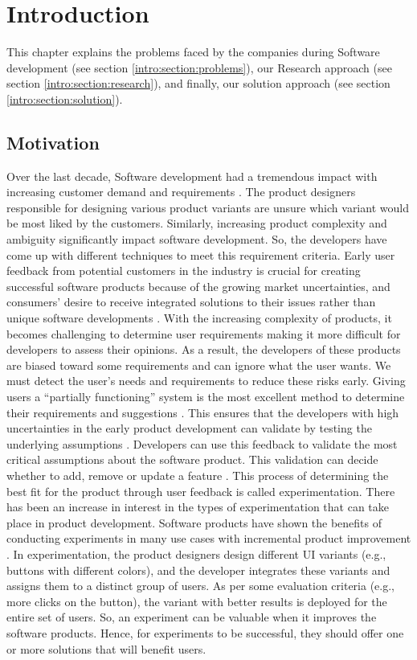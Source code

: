 \chapter{Introduction} \label{chap:intro}
This chapter explains the problems faced by the companies during Software development (see section \ref{intro:section:problems}), our Research approach (see section \ref{intro:section:research}), and finally, our solution approach (see section \ref{intro:section:solution}).

\section{Motivation}
Over the last decade, Software development had a tremendous impact with increasing customer demand and requirements \cite{article:swdemand:ahmed}. 
The product designers responsible for designing various product variants are unsure which variant would be most liked by the customers.
Similarly, increasing product complexity and ambiguity significantly impact software development. 
So, the developers have come up with different techniques to meet this requirement criteria.
Early user feedback from potential customers in the industry is crucial for creating successful software products because of the growing market uncertainties, and consumers' desire to receive integrated solutions to their issues rather than unique software developments \cite{misc:businessmodels:teece}.
With the increasing complexity of products, it becomes challenging to determine user requirements making it more difficult for developers to assess their opinions.
As a result, the developers of these products are biased toward some requirements and can ignore what the user wants. 
We must detect the user's needs and requirements to reduce these risks early. 
Giving users a ``partially functioning'' system is the most excellent method to determine their requirements and suggestions \cite{journal:prototyping:davis}.
This ensures that the developers with high uncertainties in the early product development can validate by testing the underlying assumptions \cite{misc:lean:steve}.
Developers can use this feedback to validate the most critical assumptions about the software product. 
This validation can decide whether to add, remove or update a feature \cite{article:experiments:lindgren}. 
This process of determining the best fit for the product through user feedback is called experimentation.
There has been an increase in interest in the types of experimentation that can take place in product development. 
Software products have shown the benefits of conducting experiments in many use cases with incremental product improvement \cite{article:controlled:experiements}.
In experimentation, the product designers design different UI variants (e.g., buttons with different colors), and the developer integrates these variants and assigns them to a distinct group of users. 
As per some evaluation criteria (e.g., more clicks on the button), the variant with better results is deployed for the entire set of users.
So, an experiment can be valuable when it improves the software products.
Hence, for experiments to be successful, they should offer one or more solutions that will benefit users.

